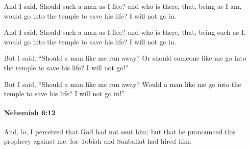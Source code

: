 			And I said, Should such a man as I flee? and who is there, that, being as I am, would go into the temple to save his life? I will not go in.

			\begin{versebox}
					\item[BHS] 
					\item[LXX] 
					\item[ASV] And I said, Should such a man as I flee? and who is there, that, being such as I, would go into the temple to save his life? I will not go in.
					\item[NIV] But I said, “Should a man like me run away? Or should someone like me go into the temple to save his life? I will not go!”
					\item[NRSV] But I said, “Should a man like me run away? Would a man like me go into the temple to save his life? I will not go in!”
			\end{versebox}

		\paragraph{Nehemiah 6:12} %
			\label{NEHEMIAH-6-12}

			And, lo, I perceived that God had not sent him; but that he pronounced this prophecy against me: for Tobiah and Sanballat had hired him.

